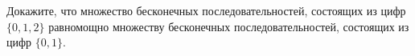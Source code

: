 Докажите, что множество бесконечных последовательностей, состоящих из цифр $\{0, 1, 2\}$ равномощно
множеству бесконечных последовательностей, состоящих из цифр $\{0, 1\}$.
